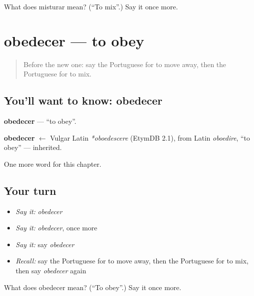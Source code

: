 \begin{tcolorbox}[breakable,colback=teal!4,colframe=teal!35!black,title={Before you move on}]
What does misturar mean? (\textquotedblleft{}To mix\textquotedblright{}.) Say it once more.
\end{tcolorbox}
\section[obedecer]{obedecer — to obey}

\label{lesson:PT-C178-obedecer}



\begin{quote}
Before the new one: say the Portuguese for to move away, then the Portuguese for to mix.
\end{quote}

\subsection*{You'll want to know: obedecer}
\textbf{obedecer} — \textquotedblleft{}to obey\textquotedblright{}.

\begin{cousinweb}
\textbf{obedecer} $\leftarrow$ Vulgar Latin \emph{*oboedescere} (EtymDB 2.1), from Latin \emph{oboedire}, \textquotedblleft{}to obey\textquotedblright{} — inherited.
\end{cousinweb}

\begin{grammarlens}[title={What you've built}]
One more word for this chapter.
\end{grammarlens}

\subsection*{Your turn}
\begin{itemize}
\raggedright
  \item \emph{Say it:} \emph{obedecer}
  \item \emph{Say it:} \emph{obedecer}, once more
  \item \emph{Say it:} say \emph{obedecer}
  \item \emph{Recall:} say the Portuguese for to move away, then the Portuguese for to mix, then say \emph{obedecer} again
\end{itemize}

\begin{tcolorbox}[breakable,colback=teal!4,colframe=teal!35!black,title={Before you move on}]
What does obedecer mean? (\textquotedblleft{}To obey\textquotedblright{}.) Say it once more.
\end{tcolorbox}
